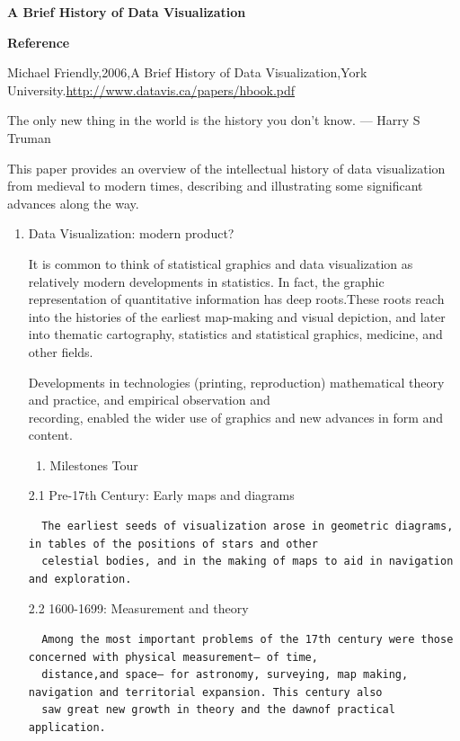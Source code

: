 \documentclass[]{book}
\providecommand{\tightlist}{%
  \setlength{\itemsep}{0pt}\setlength{\parskip}{0pt}}
\theoremstyle{definition}
\theoremstyle{definition}
\theoremstyle{definition}
\theoremstyle{remark}
\begin{document}
\begin{itemize}
  \textbf{A Brief History of Data Visualization }

  \textbf{Reference}

  Michael Friendly,2006,A Brief History of Data Visualization,York
  University.\url{http://www.datavis.ca/papers/hbook.pdf}

  The only new thing in the world is the history you don't know. ---
  Harry S Truman

  This paper provides an overview of the intellectual history of data
  visualization from medieval to modern times, describing and
  illustrating some significant advances along the way.
\end{itemize}

\begin{enumerate}
\def\labelenumi{\arabic{enumi}.}
\item
  Data Visualization: modern product?

  It is common to think of statistical graphics and data visualization
  as relatively modern developments in statistics. In fact, the graphic
  representation of quantitative information has deep roots.These roots
  reach into the histories of the earliest map-making and visual
  depiction, and later into thematic cartography, statistics and
  statistical graphics, medicine, and other fields.

  Developments in technologies (printing, reproduction) mathematical
  theory and practice, and empirical observation and\\
  recording, enabled the wider use of graphics and new advances in form
  and content.

  \begin{enumerate}
  \def\labelenumii{\arabic{enumii}.}
  \setcounter{enumii}{1}
  \tightlist
  \item
    Milestones Tour
  \end{enumerate}

  2.1 Pre-17th Century: Early maps and diagrams

\begin{verbatim}
  The earliest seeds of visualization arose in geometric diagrams, in tables of the positions of stars and other
  celestial bodies, and in the making of maps to aid in navigation and exploration. 
\end{verbatim}

  2.2 1600-1699: Measurement and theory

\begin{verbatim}
  Among the most important problems of the 17th century were those concerned with physical measurement— of time,
  distance,and space— for astronomy, surveying, map making, navigation and territorial expansion. This century also
  saw great new growth in theory and the dawnof practical application.
\end{verbatim}


\end{enumerate}
\end{document}
